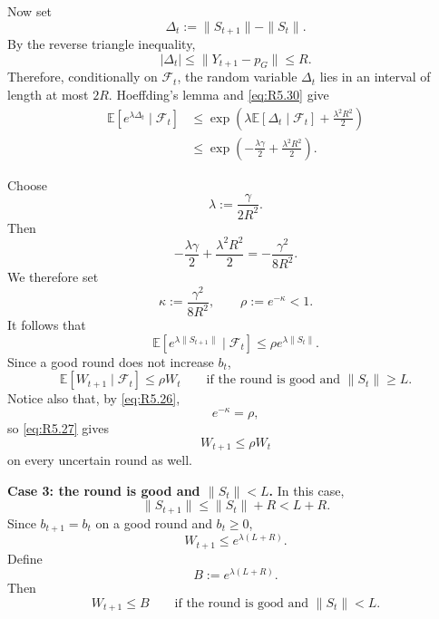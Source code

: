 \documentclass[twoside]{article}
\begin{document}
Now set
\[
    \Delta_t
    :=
    \|S_{t+1}\|-\|S_t\|.
\]
By the reverse triangle inequality,
\[
    |\Delta_t|
    \le
    \|Y_{t+1}-p_G\|
    \le
    R.
\]
Therefore, conditionally on \(\mathcal F_t\), the random variable
\(\Delta_t\) lies in an interval of length at most \(2R\). Hoeffding's
lemma and \eqref{eq:R5.30} give
\[
\begin{aligned}
    \mathbb E[
        e^{\lambda\Delta_t}
        \mid\mathcal F_t
    ]
    &\le
    \exp\left(
        \lambda
        \mathbb E[
            \Delta_t
            \mid\mathcal F_t
        ]
        +
        \frac{\lambda^2R^2}{2}
    \right)
    \\
    &\le
    \exp\left(
        -\frac{\lambda\gamma}{2}
        +
        \frac{\lambda^2R^2}{2}
    \right).
\end{aligned}
\]

Choose
\begin{equation}
    \lambda
    :=
    \frac{\gamma}{2R^2}.
    \tag{R5.31}
    \label{eq:R5.31}
\end{equation}
Then
\[
    -\frac{\lambda\gamma}{2}
    +
    \frac{\lambda^2R^2}{2}
    =
    -\frac{\gamma^2}{8R^2}.
\]
We therefore set
\begin{equation}
    \kappa
    :=
    \frac{\gamma^2}{8R^2},
    \qquad
    \rho
    :=
    e^{-\kappa}<1.
    \tag{R5.32}
    \label{eq:R5.32}
\end{equation}
It follows that
\[
    \mathbb E[
        e^{\lambda\|S_{t+1}\|}
        \mid\mathcal F_t
    ]
    \le
    \rho
    e^{\lambda\|S_t\|}.
\]
Since a good round does not increase \(b_t\),
\begin{equation}
    \mathbb E[
        W_{t+1}
        \mid\mathcal F_t
    ]
    \le
    \rho W_t
    \qquad
    \text{if the round is good and }\|S_t\|\ge L.
    \tag{R5.33}
    \label{eq:R5.33}
\end{equation}
Notice also that, by \eqref{eq:R5.26},
\[
    e^{-\kappa}
    =
    \rho,
\]
so \eqref{eq:R5.27} gives
\[
    W_{t+1}
    \le
    \rho W_t
\]
on every uncertain round as well.

\medskip

\noindent
\textbf{Case 3: the round is good and \(\|S_t\|<L\).} In this case,
\[
    \|S_{t+1}\|
    \le
    \|S_t\|+R
    <
    L+R.
\]
Since \(b_{t+1}=b_t\) on a good round and \(b_t\ge0\),
\[
    W_{t+1}
    \le
    e^{\lambda(L+R)}.
\]
Define
\begin{equation}
    B
    :=
    e^{\lambda(L+R)}.
    \tag{R5.34}
    \label{eq:R5.34}
\end{equation}
Then
\begin{equation}
    W_{t+1}
    \le
    B
    \qquad
    \text{if the round is good and }\|S_t\|<L.
    \tag{R5.35}
    \label{eq:R5.35}
\end{equation}
\end{document}
